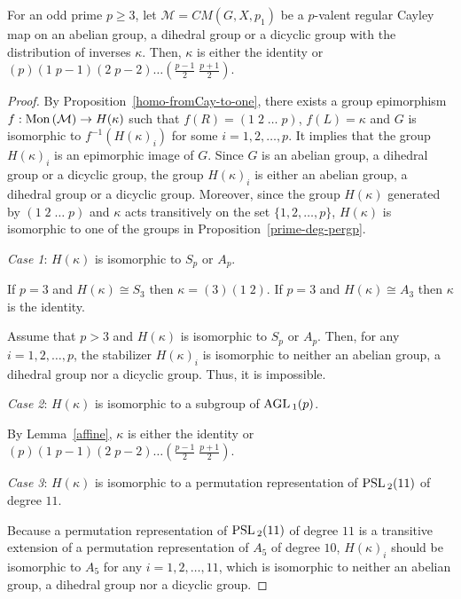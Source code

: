 \documentclass[12pt]{amsart}
\begin{document}
\begin{lemma} \label{key-lemma}
For an odd prime $p \geq 3$, let $\mathcal{ M} = CM(G, X, p_1)$ be
a $p$-valent regular Cayley map  on an abelian group, a dihedral
group or a dicyclic group with the distribution of inverses
$\kappa$.
 Then, $\kappa$ is either the identity or $(p)(1\;p-1)(2\;p-2)\ldots(\frac{p-1}{2} \; \frac{p+1}{2})$.
\end{lemma}
\begin{proof}
By Proposition~\ref{homo-fromCay-to-one}, there exists a group
epimorphism $f: {\mbox{\rm Mon\,}}(\mathcal{ M}) \rightarrow H(\kappa)$ such
that $f(R) = (1\;2\; \ldots \; p)$, $f(L) = \kappa$ and $G$ is
isomorphic to $f^{-1}(H(\kappa)_{i})$ for some $i = 1,2,\ldots,
p$. It implies that the group $H(\kappa)_{i}$ is an epimorphic
image of $G$. Since $G$ is an abelian group, a dihedral group or a
dicyclic group, the group $H(\kappa)_{i}$ is either an abelian
group, a dihedral group or a dicyclic group. Moreover, since the
group $H(\kappa)$ generated by $(1\;2\; \ldots \; p)$ and $\kappa$
acts transitively on the set $\{1,2, \ldots, p\}$, $H(\kappa)$ is
isomorphic to one of the groups in
Proposition~\ref{prime-deg-pergp}.  \medskip

\emph{Case 1}:  $H(\kappa)$ is isomorphic to $S_p$ or $A_p$.

If $p=3$ and $H(\kappa) \cong S_3$ then $\kappa = (3)(1 \; 2)$. If
$p=3$ and $H(\kappa) \cong A_3$ then $\kappa$ is the identity.

Assume that $p > 3$ and $H(\kappa)$ is isomorphic to $S_p$ or
$A_p$. Then, for any $i =1, 2, \ldots, p$, the stabilizer
$H(\kappa)_{i}$ is isomorphic to  neither an abelian group, a
dihedral group
 nor a dicyclic group. Thus, it is impossible.\medskip

\emph{Case 2}:  $H(\kappa)$ is isomorphic to a subgroup of
${\mbox{\rm AGL\,}}_1(p)$.

 By Lemma~\ref{affine}, $\kappa$ is either the identity or
 $(p)(1\;p-1)(2\;p-2)\ldots(\frac{p-1}{2} \; \frac{p+1}{2})$.
\medskip

\emph{Case 3}: $H(\kappa)$ is isomorphic to a permutation
representation of ${\mbox{\rm PSL\,}}_2(11)$ of degree $11$.

Because a permutation representation of ${\mbox{\rm PSL\,}}_2(11)$ of degree
$11$ is a transitive extension of a permutation representation of
$A_5$ of degree $10$, $H(\kappa)_{i}$ should be isomorphic to
$A_5$ for any $i = 1, 2, \ldots, 11$, which is isomorphic to
neither an abelian group, a dihedral group
 nor a dicyclic group.
\medskip


\end{proof}
\end{document}

